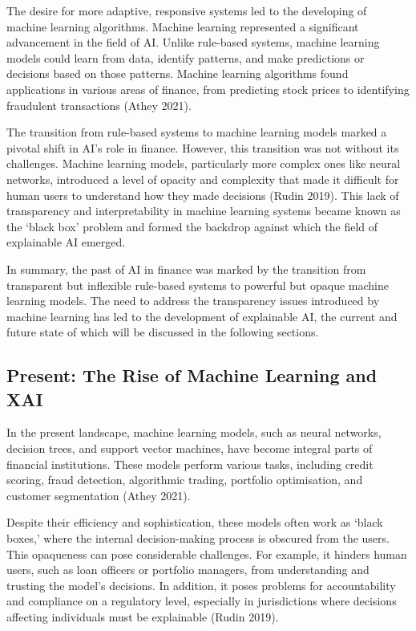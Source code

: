\documentclass[
  letterpaper,
  DIV=11,
  numbers=noendperiod]{scrartcl}
\begin{document}
The desire for more adaptive, responsive systems led to the developing
of machine learning algorithms. Machine learning represented a
significant advancement in the field of AI. Unlike rule-based systems,
machine learning models could learn from data, identify patterns, and
make predictions or decisions based on those patterns. Machine learning
algorithms found applications in various areas of finance, from
predicting stock prices to identifying fraudulent transactions (Athey
2021).

The transition from rule-based systems to machine learning models marked
a pivotal shift in AI's role in finance. However, this transition was
not without its challenges. Machine learning models, particularly more
complex ones like neural networks, introduced a level of opacity and
complexity that made it difficult for human users to understand how they
made decisions (Rudin 2019). This lack of transparency and
interpretability in machine learning systems became known as the `black
box' problem and formed the backdrop against which the field of
explainable AI emerged.

In summary, the past of AI in finance was marked by the transition from
transparent but inflexible rule-based systems to powerful but opaque
machine learning models. The need to address the transparency issues
introduced by machine learning has led to the development of explainable
AI, the current and future state of which will be discussed in the
following sections.

\hypertarget{present-the-rise-of-machine-learning-and-xai}{%
\subsection{Present: The Rise of Machine Learning and
XAI}\label{present-the-rise-of-machine-learning-and-xai}}

In the present landscape, machine learning models, such as neural
networks, decision trees, and support vector machines, have become
integral parts of financial institutions. These models perform various
tasks, including credit scoring, fraud detection, algorithmic trading,
portfolio optimisation, and customer segmentation (Athey 2021).

Despite their efficiency and sophistication, these models often work as
`black boxes,' where the internal decision-making process is obscured
from the users. This opaqueness can pose considerable challenges. For
example, it hinders human users, such as loan officers or portfolio
managers, from understanding and trusting the model's decisions. In
addition, it poses problems for accountability and compliance on a
regulatory level, especially in jurisdictions where decisions affecting
individuals must be explainable (Rudin 2019).
\end{document}
